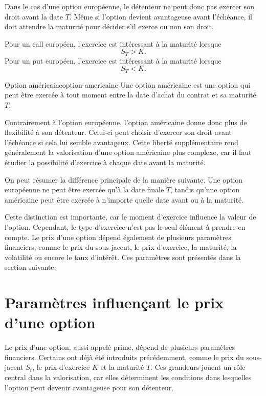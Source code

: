 \documentclass[12pt,a4paper]{report}
\begin{document}
Dans le cas d'une option européenne, le détenteur ne peut donc pas exercer son droit avant la date $T$. Même si l'option devient avantageuse avant l'échéance, il doit attendre la maturité pour décider s'il exerce ou non son droit.

Pour un call européen, l'exercice est intéressant à la maturité lorsque
\[
S_T > K.
\]
Pour un put européen, l'exercice est intéressant à la maturité lorsque
\[
S_T < K.
\]

\begin{definition}{Option américaine}{option-americaine}
Une option américaine est une option qui peut être exercée à tout moment entre la date d'achat du contrat et sa maturité $T$.
\end{definition}

Contrairement à l'option européenne, l'option américaine donne donc plus de flexibilité à son détenteur. Celui-ci peut choisir d'exercer son droit avant l'échéance si cela lui semble avantageux. Cette liberté supplémentaire rend généralement la valorisation d'une option américaine plus complexe, car il faut étudier la possibilité d'exercice à chaque date avant la maturité.

On peut résumer la différence principale de la manière suivante. Une option européenne ne peut être exercée qu'à la date finale $T$, tandis qu'une option américaine peut être exercée à n'importe quelle date avant ou à la maturité.

Cette distinction est importante, car le moment d'exercice influence la valeur de l'option. Cependant, le type d'exercice n'est pas le seul élément à prendre en compte. Le prix d'une option dépend également de plusieurs paramètres financiers, comme le prix du sous-jacent, le prix d'exercice, la maturité, la volatilité ou encore le taux d'intérêt. Ces paramètres sont présentés dans la section suivante.
\section{Paramètres influençant le prix d'une option}

Le prix d'une option, aussi appelé prime, dépend de plusieurs paramètres financiers. Certains ont déjà été introduits précédemment, comme le prix du sous-jacent $S_t$, le prix d'exercice $K$ et la maturité $T$. Ces grandeurs jouent un rôle central dans la valorisation, car elles déterminent les conditions dans lesquelles l'option peut devenir avantageuse pour son détenteur.
\end{document}
